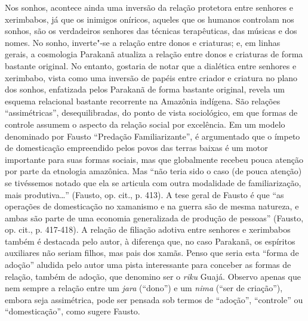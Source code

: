 Nos sonhos, acontece ainda uma inversão da relação protetora entre
senhores e xerimbabos, já que os inimigos oníricos, aqueles que os
humanos controlam nos sonhos, são os verdadeiros senhores das técnicas
terapêuticas, das músicas e dos nomes. No sonho, inverte"-se a relação
entre donos e criaturas; e, em linhas gerais, a cosmologia Parakanã
atualiza a relação entre donos e criaturas de forma bastante original.
No entanto, gostaria de notar que a dialética entre senhores e
xerimbabo, vista como uma inversão de papéis entre criador e criatura no
plano dos sonhos, enfatizada pelos Parakanã de forma bastante original,
revela um esquema relacional bastante recorrente na Amazônia indígena.
São relações ``assimétricas'', desequilibradas, do ponto de vista
sociológico, em que formas de controle assumem o aspecto da relação
social por excelência. Em um modelo denominado por Fausto ``Predação
Familiarizante'', é argumentado que o ímpeto de domesticação empreendido
pelos povos das terras baixas é um motor importante para suas formas
sociais, mas que globalmente recebeu pouca atenção por parte da
etnologia amazônica. Mas ``não teria sido o caso (de pouca atenção) se
tivéssemos notado que ela se articula com outra modalidade de
familiarização, mais produtiva\ldots{}'' (Fausto, op. cit., p. 413). A tese
geral de Fausto é que ``as operações de domesticação no xamanismo e na
guerra são de mesma natureza, e ambas são parte de uma economia
generalizada de produção de pessoas'' (Fausto, op. cit., p. 417-418). A
relação de filiação adotiva entre senhores e xerimbabos também é
destacada pelo autor, à diferença que, no caso Parakanã, os espíritos
auxiliares não seriam filhos, mas pais dos xamãs. Penso que seria esta
``forma de adoção'' aludida pelo autor uma pista interessante para
conceber as formas de relação, também de adoção, que denomino ser o
\emph{riku} Guajá. Observo apenas que nem sempre a relação entre um
\emph{jara} (``dono'') e um \emph{nima} (``ser de criação''), embora seja
assimétrica, pode ser pensada sob termos de ``adoção'', ``controle'' ou
``domesticação'', como sugere Fausto.

